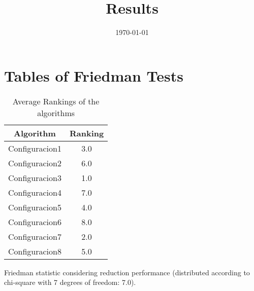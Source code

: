 \documentclass{article}
\title{Results}
\author{}
\date{\today}
\begin{document}
\oddsidemargin 0in \topmargin 0in\maketitle
\section{Tables of Friedman Tests}
\begin{table}[!htp]
\centering
\caption{Average Rankings of the algorithms
}\begin{tabular}{c|c}
Algorithm&Ranking\\
\hline
Configuracion1&3.0\\
Configuracion2&6.0\\
Configuracion3&1.0\\
Configuracion4&7.0\\
Configuracion5&4.0\\
Configuracion6&8.0\\
Configuracion7&2.0\\
Configuracion8&5.0\\
\end{tabular}
\end{table}


Friedman statistic considering reduction performance (distributed according to chi-square with 7 degrees of freedom: 7.0).
\end{document}
